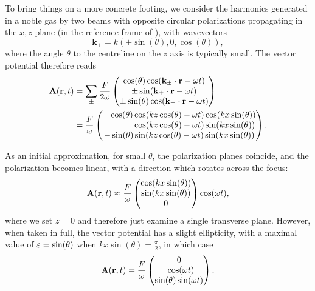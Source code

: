 To bring things on a more concrete footing, we consider the harmonics generated in a noble gas by two beams with opposite circular polarizations propagating in the $x,z$ plane (in the reference frame of ), with wavevectors 
\begin{equation}
\mathbf k_\pm=k(\pm \sin(\theta),0,\cos(\theta)),
\end{equation}
where the angle $\theta$ to the centreline on the $z$ axis is typically small. The vector potential therefore reads
\begin{align}
\vb{A}  (\vb{r},t)
& =
\sum_\pm
\frac{F}{2\omega}
\begin{pmatrix}
\cos(\theta)\cos(\vb{k}_\pm\cdot\vb{r}-\omega t) \\
\pm\sin(\vb{k}_\pm\cdot\vb{r}-\omega t)\\
\pm\sin(\theta)\cos(\vb{k}_\pm\cdot\vb{r}-\omega t)
\end{pmatrix}
\nonumber \\ & =
\frac{F}{\omega}
\begin{pmatrix}
\phantom{-}  \cos(\theta)\cos(kz\cos(\theta)-\omega t)\cos(kx\sin(\theta)) \\
\phantom{-\sin(\theta)}  \cos(kz\cos(\theta)-\omega t)\sin(kx\sin(\theta))\\
-\sin(\theta)\sin(kz\cos(\theta)-\omega t)\sin(kx\sin(\theta))
\end{pmatrix}.
\label{e9-full-field}
\end{align}



As an initial approximation, for small $\theta$, the polarization planes coincide, and the polarization becomes linear, with a direction which rotates across the focus: 
\begin{equation}
\vb{A}(\vb{r},t)
\approx
\frac{F}{\omega}
\begin{pmatrix}
\cos(kx\sin(\theta)) \\
\sin(kx\sin(\theta)) \\
0
\end{pmatrix}
\cos(\omega t),
\end{equation}
where we set $z=0$ and therefore just examine a single transverse plane. However, when taken in full, the vector potential has a slight ellipticity, with a maximal value of $\varepsilon = \sin(\theta)$ when $kx\sin(\theta)=\tfrac{\pi}{2}$, in which case
\begin{equation}
\vb{A}  (\vb{r},t)
=
\frac{F}{\omega}
\begin{pmatrix}
0 \\
\:\:\cos(\omega t)\\
\sin(\theta)\sin(\omega t)
\end{pmatrix}.
\label{e9-forwards-elliptical-field}
\end{equation}



